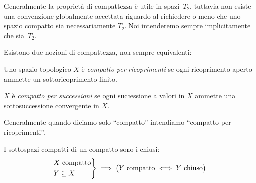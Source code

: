 
Generalmente la proprietà di compattezza è utile in spazi~$T_2$,
tuttavia non esiste una convenzione globalmente accettata
riguardo al richiedere o meno che uno spazio compatto sia necessariamente $T_2$.
Noi intenderemo sempre implicitamente che sia~$T_2$.

Esistono due nozioni di compattezza, non sempre equivalenti:

\begin{defn}
 Uno spazio topologico $X$ è \emph{compatto per ricoprimenti}
 se ogni ricoprimento aperto ammette un sottoricoprimento finito.
\end{defn}

\begin{defn}
 $X$ è \emph{compatto per successioni}
 se ogni successione a valori in $X$ ammette una sottosuccessione convergente in $X$.
\end{defn}

Generalmente quando diciamo solo ``compatto'' intendiamo ``compatto per ricoprimenti''.

\begin{prop}
 I sottospazi compatti di un compatto sono i chiusi:
 \[\begin{rcases}
  \text{$X$ compatto} \\
  Y\subseteq X
 \end{rcases}\implies
 \big(\text{$Y$ compatto $\iff Y$ chiuso}\big)\]
\end{prop}

